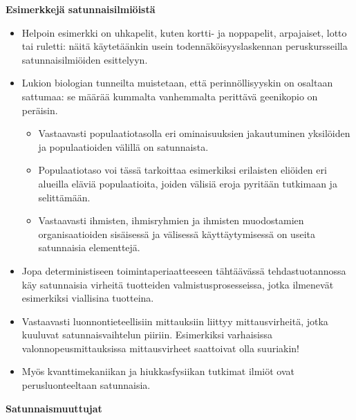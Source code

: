 \documentclass[
]{book}
\providecommand{\tightlist}{%
  \setlength{\itemsep}{0pt}\setlength{\parskip}{0pt}}
\begin{document}
\begin{eblock}{}

\textbf{Esimerkkejä satunnaisilmiöistä}

\begin{itemize}
\tightlist
\item
  Helpoin esimerkki on uhkapelit, kuten kortti- ja noppapelit, arpajaiset, lotto tai ruletti: näitä käytetäänkin usein todennäköisyyslaskennan peruskursseilla satunnaisilmiöiden esittelyyn.
\item
  Lukion biologian tunneilta muistetaan, että perinnöllisyyskin on osaltaan sattumaa: se määrää kummalta vanhemmalta perittävä geenikopio on peräisin.

  \begin{itemize}
  \tightlist
  \item
    Vastaavasti populaatiotasolla eri ominaisuuksien jakautuminen yksilöiden ja populaatioiden välillä on satunnaista.
  \item
    Populaatiotaso voi tässä tarkoittaa esimerkiksi erilaisten eliöiden eri alueilla eläviä populaatioita, joiden välisiä eroja pyritään tutkimaan ja selittämään.
  \item
    Vastaavasti ihmisten, ihmisryhmien ja ihmisten muodostamien organisaatioiden sisäisessä ja välisessä käyttäytymisessä on useita satunnaisia elementtejä.
  \end{itemize}
\item
  Jopa deterministiseen toimintaperiaatteeseen tähtäävässä tehdastuotannossa käy satunnaisia virheitä tuotteiden valmistusprosesseissa, jotka ilmenevät esimerkiksi viallisina tuotteina.
\item
  Vastaavasti luonnontieteellisiin mittauksiin liittyy mittausvirheitä, jotka kuuluvat satunnaisvaihtelun piiriin. Esimerkiksi varhaisissa valonnopeusmittauksissa mittausvirheet saattoivat olla suuriakin!
\item
  Myös kvanttimekaniikan ja hiukkasfysiikan tutkimat ilmiöt ovat perusluonteeltaan satunnaisia.
\end{itemize}

\end{eblock}

\textbf{Satunnaismuuttujat}
\end{document}
